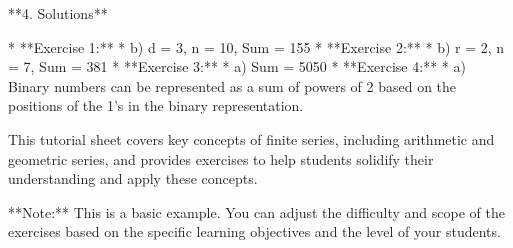 **4. Solutions**

*   **Exercise 1:** 
      *   b) d = 3, n = 10, Sum = 155
*   **Exercise 2:** 
      *   b) r = 2, n = 7, Sum = 381
*   **Exercise 3:** 
      *   a) Sum = 5050
*   **Exercise 4:** 
      *   a) Binary numbers can be represented as a sum of powers of 2 based on the positions of the 1's in the binary representation.

This tutorial sheet covers key concepts of finite series, including arithmetic and geometric series, and provides exercises to help students solidify their understanding and apply these concepts. 

**Note:** This is a basic example. You can adjust the difficulty and scope of the exercises based on the specific learning objectives and the level of your students.
